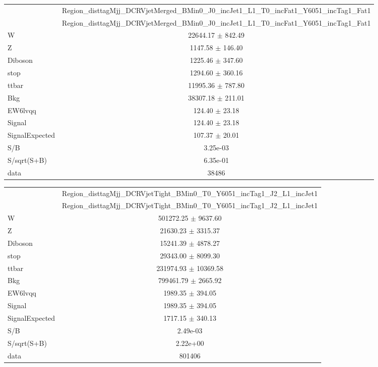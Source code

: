 \documentclass{article}
\begin{document}
\begin{table}
\centering
\small
\begin{tabular}{l|c|}
\cline{2-2}
 & \multicolumn{1}{c|}{Region\_disttagMjj\_DCRVjetMerged\_BMin0\_J0\_incJet1\_L1\_T0\_incFat1\_Y6051\_incTag1\_Fat1}\\
\cline{2-2}
 & \multicolumn{1}{c|}{Region\_disttagMjj\_DCRVjetMerged\_BMin0\_J0\_incJet1\_L1\_T0\_incFat1\_Y6051\_incTag1\_Fat1}\\ \hline
W & 22644.17 $\pm$ 842.49\\
Z & 1147.58 $\pm$ 146.40\\
Diboson & 1225.46 $\pm$ 347.60\\
stop & 1294.60 $\pm$ 360.16\\
ttbar & 11995.36 $\pm$ 787.80\\
\hline
Bkg & 38307.18 $\pm$ 211.01\\
\hline
EW6lvqq & 124.40 $\pm$ 23.18\\
\hline
Signal & 124.40 $\pm$ 23.18\\
SignalExpected & 107.37 $\pm$ 20.01\\
\hline
S/B & 3.25e-03\\
S/sqrt(S+B) & 6.35e-01\\
\hline
data & 38486\\ \hline
\end{tabular}
\end{table}


\begin{table}
\centering
\small
\begin{tabular}{l|c|}
\cline{2-2}
 & \multicolumn{1}{c|}{Region\_disttagMjj\_DCRVjetTight\_BMin0\_T0\_Y6051\_incTag1\_J2\_L1\_incJet1}\\
\cline{2-2}
 & \multicolumn{1}{c|}{Region\_disttagMjj\_DCRVjetTight\_BMin0\_T0\_Y6051\_incTag1\_J2\_L1\_incJet1}\\ \hline
W & 501272.25 $\pm$ 9637.60\\
Z & 21630.23 $\pm$ 3315.37\\
Diboson & 15241.39 $\pm$ 4878.27\\
stop & 29343.00 $\pm$ 8099.30\\
ttbar & 231974.93 $\pm$ 10369.58\\
\hline
Bkg & 799461.79 $\pm$ 2665.92\\
\hline
EW6lvqq & 1989.35 $\pm$ 394.05\\
\hline
Signal & 1989.35 $\pm$ 394.05\\
SignalExpected & 1717.15 $\pm$ 340.13\\
\hline
S/B & 2.49e-03\\
S/sqrt(S+B) & 2.22e+00\\
\hline
data & 801406\\ \hline
\end{tabular}
\end{table}
\end{document}
